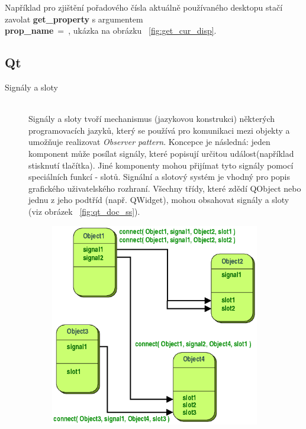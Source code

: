 \documentclass[thesis=B,czech]{FITthesis}[2012/06/26]
\begin{document}
\begin{description}
	Například pro zjištění pořadového čísla aktuálně používaného desktopu stačí zavolat \textbf{get\_property} s argumentem\\ \mbox{\textbf{prop\_name} = }, ukázka na obrázku ~\ref{fig:get_cur_disp}. 
\end{description}

\subsection{Qt}


\begin{description}
	\item[Signály a sloty]\hspace*{\fill} \\
	
Signály a sloty \cite{ss} tvoří mechanismus (jazykovou konstrukci) některých programovacích jazyků, který se používá pro komunikaci mezi objekty a umožňuje realizovat \textit{Observer pattern}. Koncepce je následná: jeden komponent může posílat signály, které popisují určitou událost(například stisknutí tlačítka). Jiné komponenty mohou přijímat tyto signály pomocí speciálních funkcí - slotů. Signální a slotový systém je vhodný pro popis grafického uživatelského rozhraní. Všechny třídy, které zdědí QObject nebo jednu z jeho podtříd (např. QWidget), mohou obsahovat signály a sloty (viz obrázek ~\ref{fig:qt_doc_ss}).\\
 \begin{figure}[H]\centering
	\includegraphics[width=0.9\textwidth]{qt_doc_ss.png}

\end{figure}
\end{description}
\end{document}
